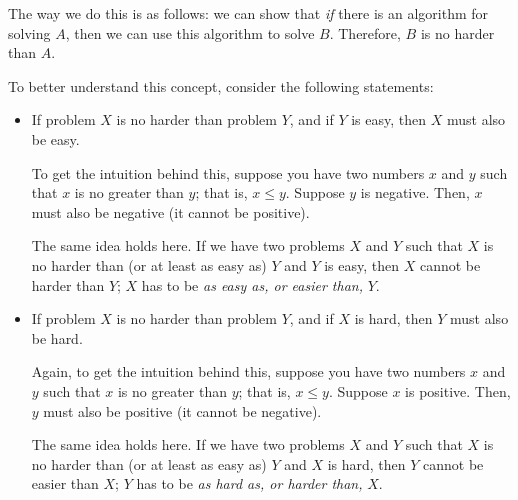 \documentclass[letterpaper]{article}
\begin{document}
\bigskip 

The way we do this is as follows: we can show that \emph{if} there is an algorithm for solving $A$, then we can use this algorithm to solve $B$. Therefore, $B$ is no harder than $A$. 

\bigskip 

To better understand this concept, consider the following statements:
\begin{itemize}
    \item If problem $X$ is no harder than problem $Y$, and if $Y$ is easy, then $X$ must also be easy. 
    \begin{mdframed}[]
        To get the intuition behind this, suppose you have two numbers $x$ and $y$ such that $x$ is no greater than $y$; that is, $x \leq y$. Suppose $y$ is negative. Then, $x$ must also be negative (it cannot be positive). 

        \bigskip 

        The same idea holds here. If we have two problems $X$ and $Y$ such that $X$ is no harder than (or at least as easy as) $Y$ and $Y$ is easy, then $X$ cannot be harder than $Y$; $X$ has to be \emph{as easy as, or easier than,} $Y$. 
    \end{mdframed}
    \item If problem $X$ is no harder than problem $Y$, and if $X$ is hard, then $Y$ must also be hard. 
    \begin{mdframed}[]
        Again, to get the intuition behind this, suppose you have two numbers $x$ and $y$ such that $x$ is no greater than $y$; that is, $x \leq y$. Suppose $x$ is positive. Then, $y$ must also be positive (it cannot be negative). 

        \bigskip 

        The same idea holds here. If we have two problems $X$ and $Y$ such that $X$ is no harder than (or at least as easy as) $Y$ and $X$ is hard, then $Y$ cannot be easier than $X$; $Y$ has to be \emph{as hard as, or harder than,} $X$. 
    \end{mdframed}
\end{itemize}
\end{document}
